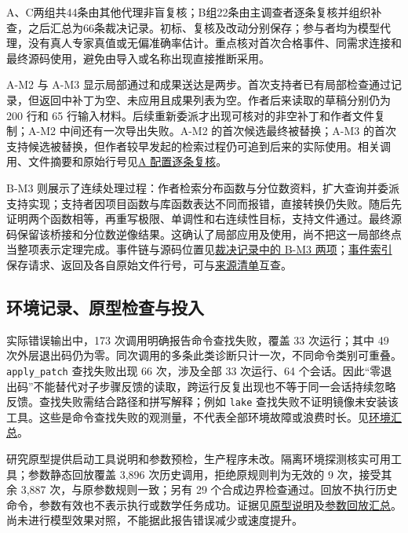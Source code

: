 A、C两组共44条由其他代理非盲复核；B组22条由主调查者逐条复核并组织补查，之后汇总为66条裁决记录。初标、复核及改动分别保存；参与者均为模型代理，没有真人专家真值或无偏准确率估计。重点核对首次合格事件、同需求连接和最终源码使用，避免由导入或名称出现直接推断采用。

A-M2 与 A-M3 显示局部通过和成果送达是两步。首次支持者已有局部检查通过记录，但返回中补丁为空、未应用且成果列表为空。作者后来读取的草稿分别仍为 200 行和 65 行输入材料。后续重新委派才出现可核对的非空补丁和作者文件复制；A-M2 中间还有一次导出失败。A-M2 的首次候选最终被替换；A-M3 的首次支持候选被替换，但作者较早发起的检索过程仍可追到后来的实际使用。相关调用、文件摘要和原始行号见\href{research/semantic/review_A.json}{A 配置逐条复核}。

B-M3 则展示了连续处理过程：作者检索分布函数与分位数资料，扩大查询并委派支持实现；支持者因项目函数与库函数表达不同而报错，直接转换仍失败。随后先证明两个函数相等，再重写极限、单调性和右连续性目标，支持文件通过。最终源码保留该桥接和分位数逆像结果。这确认了局部应用及使用，尚不把这一局部终点当整项表示定理完成。事件链与源码位置见\href{research/semantic/adjudicated_annotations.json}{裁决记录中的 B-M3 两项}；\href{research/extraction/events.jsonl}{事件索引}保存请求、返回及各自原始文件行号，可与\href{research/extraction/source_manifest.json}{来源清单}互查。

\subsection[环境记录、原型检查与投入]{\texorpdfstring{\protect\hypertarget{s4}{}环境记录、原型检查与投入}{环境记录、原型检查与投入}}
实际错误输出中，173 次调用明确报告命令查找失败，覆盖 33 次运行；其中 49 次外层退出码仍为零。同次调用的多条此类诊断只计一次，不同命令类别可重叠。\nolinkurl{apply_patch} 查找失败出现 66 次，涉及全部 33 次运行、64 个会话。因此“零退出码”不能替代对子步骤反馈的读取，跨运行反复出现也不等于同一会话持续忽略反馈。查找失败需结合路径和拼写解释；例如 \nolinkurl{lake} 查找失败不证明镜像未安装该工具。这些是命令查找失败的观测量，不代表全部环境故障或浪费时长。见\href{research/analysis/environment_summary.json}{环境汇总}。

研究原型提供启动工具说明和参数预检，生产程序未改。隔离环境探测核实可用工具；参数静态回放覆盖 3,896 次历史调用，拒绝原规则判为无效的 9 次，接受其余 3,887 次，与原参数规则一致；另有 29 个合成边界检查通过。回放不执行历史命令，参数有效也不表示执行或数学任务成功。证据见\href{research/interventions/README.zh-CN.md}{原型说明}及\href{research/interventions/argument_replay/summary.json}{参数回放汇总}。尚未进行模型效果对照，不能据此报告错误减少或速度提升。


